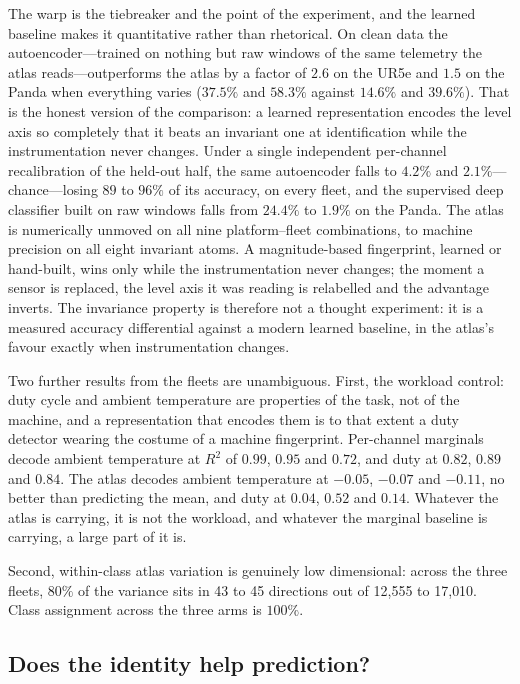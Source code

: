 \documentclass[11pt]{article}
\begin{document}
The warp is the tiebreaker and the point of the experiment, and the learned
baseline makes it quantitative rather than rhetorical. On clean data the
autoencoder---trained on nothing but raw windows of the same telemetry the
atlas reads---outperforms the atlas by a factor of $2.6$ on the UR5e and $1.5$
on the Panda when everything varies ($37.5\%$ and $58.3\%$ against $14.6\%$
and $39.6\%$). That is the honest version of the comparison: a learned
representation encodes the level axis so completely that it beats an
invariant one at identification while the instrumentation never changes. Under
a single independent per-channel recalibration of the held-out half, the same
autoencoder falls to $4.2\%$ and $2.1\%$---chance---losing $89$ to $96\%$ of
its accuracy, on every fleet, and the supervised deep classifier built on raw
windows falls from $24.4\%$ to $1.9\%$ on the Panda. The atlas is numerically
unmoved on all nine platform--fleet combinations, to machine precision on all
eight invariant atoms. A magnitude-based fingerprint, learned or hand-built,
wins only while the instrumentation never changes; the moment a sensor is
replaced, the level axis it was reading is relabelled and the advantage
inverts. The invariance property is therefore not a thought experiment: it is
a measured accuracy differential against a modern learned baseline, in the
atlas's favour exactly when instrumentation changes.

Two further results from the fleets are unambiguous. First, the workload
control: duty cycle and ambient temperature are properties of the task, not of
the machine, and a representation that encodes them is to that extent a duty
detector wearing the costume of a machine fingerprint. Per-channel marginals
decode ambient temperature at $R^2$ of $0.99$, $0.95$ and $0.72$, and duty at
$0.82$, $0.89$ and $0.84$. The atlas decodes ambient temperature at $-0.05$,
$-0.07$ and $-0.11$, no better than predicting the mean, and duty at $0.04$,
$0.52$ and $0.14$. Whatever the atlas is carrying, it is not the workload, and
whatever the marginal baseline is carrying, a large part of it is.


Second, within-class atlas variation is genuinely low dimensional: across the
three fleets, $80\%$ of the variance sits in 43 to 45 directions out of
12{,}555 to 17{,}010. Class assignment across the three arms is $100\%$.

\subsection{Does the identity help prediction?}
\end{document}
